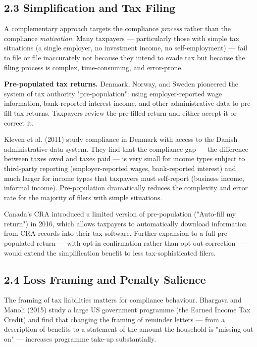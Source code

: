\documentclass[12pt, letterpaper]{article}
\begin{document}
\subsection{2.3 Simplification and Tax Filing}


A complementary approach targets the compliance \textit{process} rather than the compliance \textit{motivation}. Many taxpayers --- particularly those with simple tax situations (a single employer, no investment income, no self-employment) --- fail to file or file inaccurately not because they intend to evade tax but because the filing process is complex, time-consuming, and error-prone.

\textbf{Pre-populated tax returns.} Denmark, Norway, and Sweden pioneered the system of tax authority "pre-population": using employer-reported wage information, bank-reported interest income, and other administrative data to pre-fill tax returns. Taxpayers review the pre-filled return and either accept it or correct it.

Kleven et al. (2011) study compliance in Denmark with access to the Danish administrative data system. They find that the compliance gap --- the difference between taxes owed and taxes paid --- is very small for income types subject to third-party reporting (employer-reported wages, bank-reported interest) and much larger for income types that taxpayers must self-report (business income, informal income). Pre-population dramatically reduces the complexity and error rate for the majority of filers with simple situations.

Canada's CRA introduced a limited version of pre-population ("Auto-fill my return") in 2016, which allows taxpayers to automatically download information from CRA records into their tax software. Further expansion to a full pre-populated return --- with opt-in confirmation rather than opt-out correction --- would extend the simplification benefit to less tax-sophisticated filers.


\subsection{2.4 Loss Framing and Penalty Salience}


The framing of tax liabilities matters for compliance behaviour. Bhargava and Manoli (2015) study a large US government programme (the Earned Income Tax Credit) and find that changing the framing of reminder letters --- from a description of benefits to a statement of the amount the household is "missing out on" --- increases programme take-up substantially.
\end{document}

